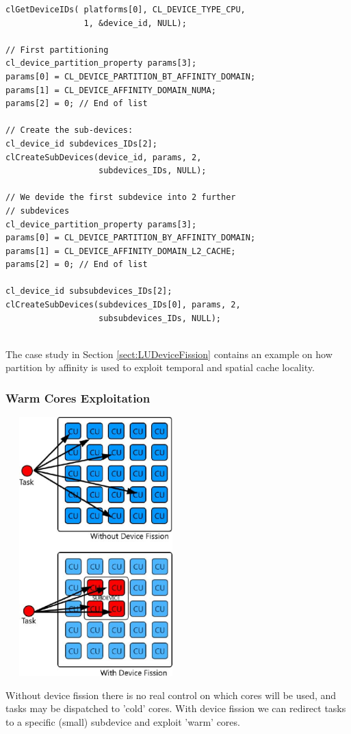 {\footnotesize\begin{verbatim}
clGetDeviceIDs( platforms[0], CL_DEVICE_TYPE_CPU,
                1, &device_id, NULL);

// First partitioning
cl_device_partition_property params[3];
params[0] = CL_DEVICE_PARTITION_BT_AFFINITY_DOMAIN;
params[1] = CL_DEVICE_AFFINITY_DOMAIN_NUMA; 
params[2] = 0; // End of list

// Create the sub-devices:
cl_device_id subdevices_IDs[2];
clCreateSubDevices(device_id, params, 2,
                   subdevices_IDs, NULL);
									
// We devide the first subdevice into 2 further
// subdevices
cl_device_partition_property params[3];
params[0] = CL_DEVICE_PARTITION_BY_AFFINITY_DOMAIN;
params[1] = CL_DEVICE_AFFINITY_DOMAIN_L2_CACHE; 
params[2] = 0; // End of list

cl_device_id subsubdevices_IDs[2];
clCreateSubDevices(subdevices_IDs[0], params, 2,
                   subsubdevices_IDs, NULL);


\end{verbatim}}

The case study in Section \ref{sect:LUDeviceFission} contains an example on how partition by affinity is used to exploit temporal and spatial cache locality.

\vfill
\columnbreak

\subsubsection{Warm Cores Exploitation}

\begin{figurehere}
 \centering
 \includegraphics[width=7cm, height=10cm]{./eps/WarmCores.eps}
 \caption{Without device fission there is no real control on which cores will be used, and tasks may be dispatched to 'cold' cores. With device fission we can redirect tasks to a specific (small) subdevice and exploit 'warm' cores.}
 \label{fig:WarmCores}
\end{figurehere}

